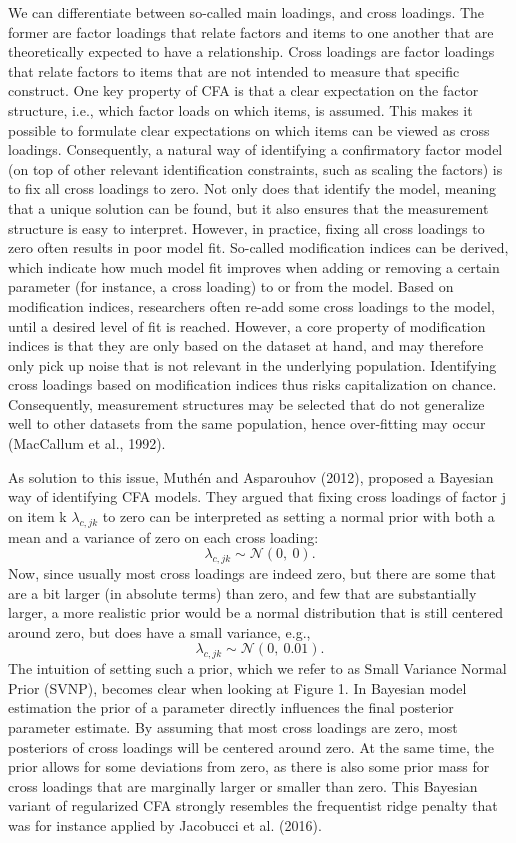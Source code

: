 \documentclass[
  man, donotrepeattitle,floatsintext]{apa6}
\begin{document}
We can differentiate between so-called main loadings, and cross
loadings. The former are factor loadings that relate factors and items
to one another that are theoretically expected to have a relationship.
Cross loadings are factor loadings that relate factors to items that are
not intended to measure that specific construct. One key property of CFA
is that a clear expectation on the factor structure, i.e., which factor
loads on which items, is assumed. This makes it possible to formulate clear
expectations on which items can be viewed as cross loadings.
Consequently, a natural way of identifying a confirmatory factor model
(on top of other relevant identification constraints, such as scaling
the factors) is to fix all cross loadings to zero. Not only does that
identify the model, meaning that a unique solution can be found, but it
also ensures that the measurement structure is easy to interpret.
However, in practice, fixing all cross loadings to zero often results in
poor model fit. So-called modification indices can be derived, which
indicate how much model fit improves when adding or removing a certain
parameter (for instance, a cross loading) to or from the model. Based on
modification indices, researchers often re-add some cross loadings to
the model, until a desired level of fit is reached. However, a core
property of modification indices is that they are only based on the
dataset at hand, and may therefore only pick up noise that is not
relevant in the underlying population. Identifying cross loadings based
on modification indices thus risks capitalization on chance.
Consequently, measurement structures may be selected that do not
generalize well to other datasets from the same population, hence
over-fitting may occur (MacCallum et al., 1992).

As solution to this issue, Muthén and Asparouhov (2012), proposed a Bayesian
way of identifying CFA models. They argued that fixing cross loadings of
factor j on item k \(\lambda_{c,jk}\) to zero can be interpreted as
setting a normal prior with both a mean and a variance of zero on each
cross loading: \[\lambda_{c,jk}  \sim \mathcal{N}(0, \ 0).\] Now, since
usually most cross loadings are indeed zero, but there are some that are
a bit larger (in absolute terms) than zero, and few that are
substantially larger, a more realistic prior would be a normal
distribution that is still centered around zero, but does have a small
variance, e.g.,\\
\[\lambda_{c,jk}  \sim \mathcal{N}(0, \ 0.01).\] The intuition of
setting such a prior, which we refer to as Small Variance Normal Prior
(SVNP), becomes clear when looking at Figure 1. In Bayesian model
estimation the prior of a parameter directly influences the final
posterior parameter estimate. By assuming that most cross loadings are
zero, most posteriors of cross loadings will be centered around zero. At
the same time, the prior allows for some deviations from zero, as there
is also some prior mass for cross loadings that are marginally larger or
smaller than zero. This Bayesian variant of regularized CFA strongly
resembles the frequentist ridge penalty that was for instance applied by
Jacobucci et al. (2016).
\end{document}
